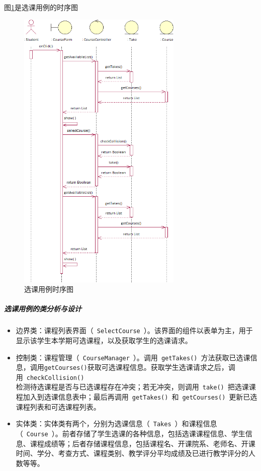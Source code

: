 图\ref{fig:selectcourse_secquence}是选课用例的时序图
\begin{figure}[htbp]
  \centering
  \includegraphics[width=0.7\textwidth]{img/selectcourse_secquence}
  \caption{选课用例时序图}
  \label{fig:selectcourse_secquence}
\end{figure}
    
\subparagraph{选课用例的类分析与设计}
\begin{itemize}
  \item 边界类：课程列表界面（~\texttt{SelectCourse}~）。该界面的组件以表单为主，用于显示该学生本学期可选课程，以及获取学生的选课请求。

  \item 控制类：课程管理（~\texttt{CourseManager}~）。调用~\texttt{getTakes()}~方法获取已选课信息，调用\texttt{getCourses()}获取可选课程信息。获取学生选课请求之后，调用~\texttt{checkCollision()}~\\检测待选课程是否与已选课程存在冲突；若无冲突，则调用~\texttt{take()}~把选课课程加入到选课信息表中；最后再调用~\texttt{getTakes()}~和~\texttt{getCourses()}~更新已选课程列表和可选课程列表。

  \item 实体类：实体类有两个，分别为选课信息（~\texttt{Takes}~）和课程信息（~\texttt{Course}~）。前者存储了学生选课的各种信息，包括选课课程信息、学生信息、课程成绩等；后者存储课程信息，包括课程名、开课院系、老师名、开课时间、学分、考查方式、课程类别、教学评分平均成绩及已进行教学评分的人数等等。
\end{itemize}
    
